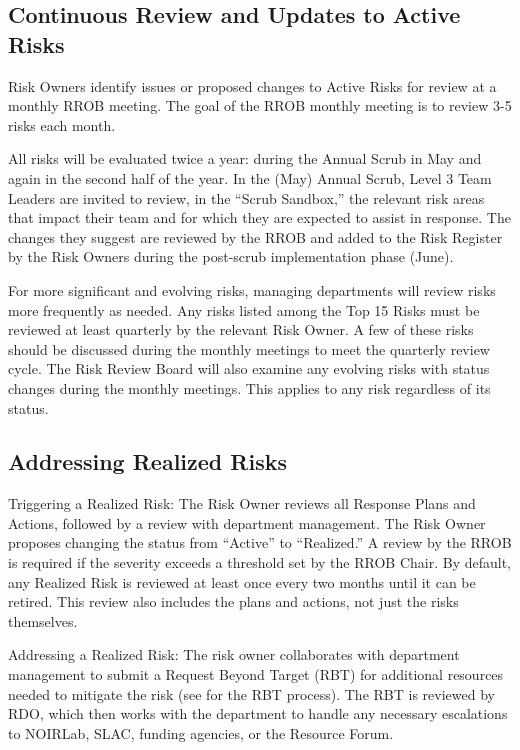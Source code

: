 \subsection{Continuous Review and Updates to Active Risks}

Risk Owners identify issues or proposed changes to Active Risks for review at a monthly RROB meeting. The goal of the RROB monthly meeting is to review 3-5 risks each month.

All risks will be evaluated twice a year: during the Annual Scrub in May and again in the second half of the year. In the (May) Annual Scrub, Level 3 Team Leaders are invited to review, in the ``Scrub Sandbox,'' the relevant risk areas that impact their team and for which they are expected to assist in response. The changes they suggest are reviewed by the RROB and added to the Risk Register by the Risk Owners during the post-scrub implementation phase (June).

For more significant and evolving risks, managing departments will review risks more frequently as needed. Any risks listed among the Top 15 Risks must be reviewed at least quarterly by the relevant Risk Owner. A few of these risks should be discussed during the monthly meetings to meet the quarterly review cycle. The Risk Review Board will also examine any evolving risks with status changes during the monthly meetings. This applies to any risk regardless of its status. 

\subsection{Addressing Realized Risks}

Triggering a Realized Risk:
The Risk Owner reviews all Response Plans and Actions, followed by a review with department management.
The Risk Owner proposes changing the status from ``Active'' to ``Realized.''
A review by the RROB is required if the severity exceeds a threshold set by the RROB Chair.
By default, any Realized Risk is reviewed at least once every two months until it can be retired.
This review also includes the plans and actions, not just the risks themselves. 

Addressing a Realized Risk:
The risk owner collaborates with department management to submit a Request Beyond Target (RBT) for additional resources needed to mitigate the risk (see  for the RBT process).
The RBT is reviewed by RDO, which then works with the department to handle any necessary escalations to NOIRLab, SLAC, funding agencies, or the Resource Forum.

